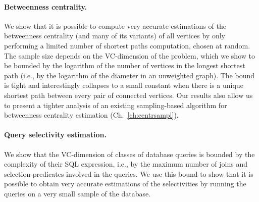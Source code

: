 \paragraph*{Betweenness centrality.} We show that it is possible to compute very
accurate estimations of the betweenness centrality (and many of its variants) of
all vertices by only performing a limited number of shortest paths computation,
chosen at random. The sample size depends on the VC-dimension of the problem,
which we show to be bounded by the logarithm of the number of vertices in the
longest shortest path (i.e., by the logarithm of the diameter in an unweighted
graph). The bound is tight and interestingly collapses to a small constant when
there is a unique shortest path between every pair of connected vertices. Our
results also allow us to present a tighter analysis of an existing
sampling-based algorithm for betweenness centrality estimation
(Ch.~\ref{ch:centrsampl}).

\paragraph*{Query selectivity estimation.}  We show that the VC-dimension of
classes of database queries is bounded by the complexity of their SQL
expression, i.e., by the maximum number of joins and selection predicates
involved in the queries. We use this bound to show that it is possible to
obtain very accurate estimations of the selectivities by running the queries on
a very small sample of the database. 

